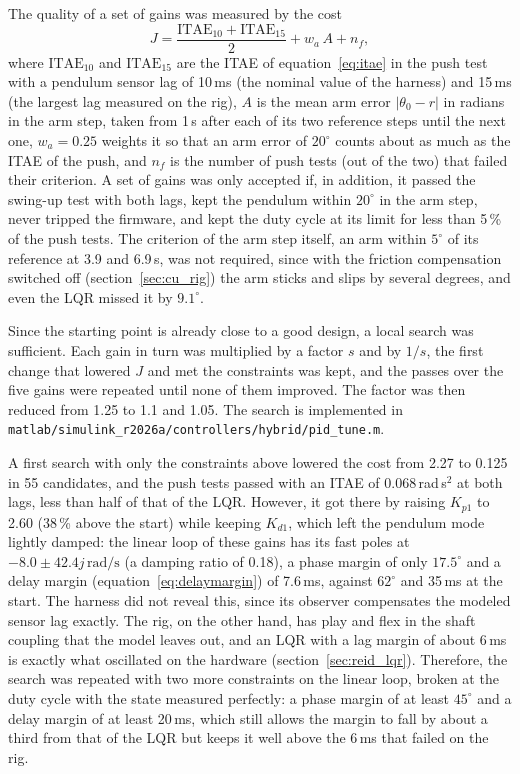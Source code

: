 \documentclass[a4paper,11pt]{article}
\begin{document}
The quality of a set of gains was measured by the cost
\begin{equation}
  J = \frac{\mathrm{ITAE}_{10} + \mathrm{ITAE}_{15}}{2} + w_a\, A + n_f ,
  \label{eq:pid_cost}
\end{equation}
where $\mathrm{ITAE}_{10}$ and $\mathrm{ITAE}_{15}$ are the ITAE of equation~\ref{eq:itae} in the push test with a pendulum sensor lag of 10\,ms (the nominal value of the harness) and 15\,ms (the largest lag measured on the rig), $A$ is the mean arm error $|\theta_0 - r|$ in radians in the arm step, taken from 1\,s after each of its two reference steps until the next one, $w_a = 0.25$ weights it so that an arm error of $20^\circ$ counts about as much as the ITAE of the push, and $n_f$ is the number of push tests (out of the two) that failed their criterion. A set of gains was only accepted if, in addition, it passed the swing-up test with both lags, kept the pendulum within $20^\circ$ in the arm step, never tripped the firmware, and kept the duty cycle at its limit for less than 5\,\% of the push tests. The criterion of the arm step itself, an arm within $5^\circ$ of its reference at 3.9 and 6.9\,s, was not required, since with the friction compensation switched off (section~\ref{sec:cu_rig}) the arm sticks and slips by several degrees, and even the LQR missed it by $9.1^\circ$.

Since the starting point is already close to a good design, a local search was sufficient. Each gain in turn was multiplied by a factor $s$ and by $1/s$, the first change that lowered $J$ and met the constraints was kept, and the passes over the five gains were repeated until none of them improved. The factor was then reduced from 1.25 to 1.1 and 1.05. The search is implemented in \nolinkurl{matlab/simulink_r2026a/controllers/hybrid/pid_tune.m}.

A first search with only the constraints above lowered the cost from 2.27 to 0.125 in 55 candidates, and the push tests passed with an ITAE of 0.068\,rad\,s$^2$ at both lags, less than half of that of the LQR. However, it got there by raising $K_{p1}$ to 2.60 (38\,\% above the start) while keeping $K_{d1}$, which left the pendulum mode lightly damped: the linear loop of these gains has its fast poles at $-8.0 \pm 42.4j\,\mathrm{rad/s}$ (a damping ratio of 0.18), a phase margin of only $17.5^\circ$ and a delay margin (equation~\ref{eq:delaymargin}) of 7.6\,ms, against $62^\circ$ and 35\,ms at the start. The harness did not reveal this, since its observer compensates the modeled sensor lag exactly. The rig, on the other hand, has play and flex in the shaft coupling that the model leaves out, and an LQR with a lag margin of about 6\,ms is exactly what oscillated on the hardware (section~\ref{sec:reid_lqr}). Therefore, the search was repeated with two more constraints on the linear loop, broken at the duty cycle with the state measured perfectly: a phase margin of at least $45^\circ$ and a delay margin of at least 20\,ms, which still allows the margin to fall by about a third from that of the LQR but keeps it well above the 6\,ms that failed on the rig.
\end{document}
